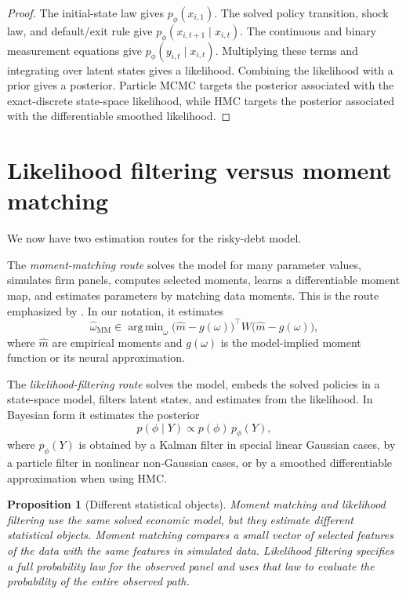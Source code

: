 \documentclass[11pt]{article}
\newtheorem{proposition}{Proposition}
\newcommand{\1}{\mathbf{1}}
\DeclareMathOperator*{\argmin}{arg\,min}
\begin{document}
\begin{proof}
The initial-state law gives \(p_\phi(x_{i,1})\). The solved policy transition,
shock law, and default/exit rule give \(p_\phi(x_{i,t+1}\mid x_{i,t})\). The
continuous and binary measurement equations give \(p_\phi(y_{i,t}\mid x_{i,t})\).
Multiplying these terms and integrating over latent states gives a likelihood.
Combining the likelihood with a prior gives a posterior. Particle MCMC targets
the posterior associated with the exact-discrete state-space likelihood, while
HMC targets the posterior associated with the differentiable smoothed
likelihood.
\end{proof}

\section{Likelihood filtering versus moment matching}
\label{sec:likelihood-vs-moments}

We now have two estimation routes for the risky-debt model.

The \emph{moment-matching route} solves the model for many parameter values,
simulates firm panels, computes selected moments, learns a differentiable
moment map, and estimates parameters by matching data moments. This is the
route emphasized by \citet[Section 3]{duartefonseca2026ai}. In our notation,
it estimates
\begin{equation}
  \widehat\omega_{\mathrm{MM}}
  \in
  \argmin_\omega
  \bigl(\widehat m-g(\omega)\bigr)^\top W
  \bigl(\widehat m-g(\omega)\bigr),
  \label{eq:mm-estimator}
\end{equation}
where \(\widehat m\) are empirical moments and \(g(\omega)\) is the
model-implied moment function or its neural approximation.

The \emph{likelihood-filtering route} solves the model, embeds the solved
policies in a state-space model, filters latent states, and estimates from the
likelihood. In Bayesian form it estimates the posterior
\begin{equation}
  p(\phi\mid Y)
  \propto
  p(\phi)\,p_\phi(Y),
  \label{eq:likelihood-route-posterior}
\end{equation}
where \(p_\phi(Y)\) is obtained by a Kalman filter in special linear Gaussian
cases, by a particle filter in nonlinear non-Gaussian cases, or by a smoothed
differentiable approximation when using HMC.

\begin{proposition}[Different statistical objects]
\label{prop:mm-vs-likelihood-object}
Moment matching and likelihood filtering use the same solved economic model,
but they estimate different statistical objects. Moment matching compares a
small vector of selected features of the data with the same features in
simulated data. Likelihood filtering specifies a full probability law for the
observed panel and uses that law to evaluate the probability of the entire
observed path.
\end{proposition}
\end{document}
